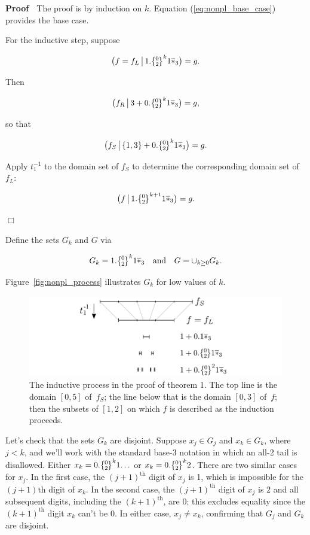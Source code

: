 \documentclass[]{article}
\begin{document}
\textbf{Proof} \(\;\) The proof is by induction on \(k\). Equation
(\ref{eq:nonpl_base_case}) provides the base case.

For the inductive step, suppose

\[\big(f=f_L \restrict 1.\zerotwo^k1\lstar \big) = g.\]

Then

\[\big(f_R \restrict 3 + 0.\zerotwo^k1\lstar \big) = g,\]

so that

\[\big(f_S \restrict \{1,3\} + 0.\zerotwo^k1\lstar \big) = g.\]

Apply \(t_1^{-1}\) to the domain set of \(f_S\) to determine the
corresponding domain set of \(f_L\):

\[\big(f \restrict 1.\zerotwo^{k+1}1\lstar \big) = g.\]

\hfill\(\Box\)

Define the sets \(G_k\) and \(G\) via

\begin{equation}G_k = 1.\zerotwo^k1\lstar \quad\text{and}\quad
  G = \cup_{k \ge 0}G_k.\label{eq:Gk_G}\end{equation}

Figure~\ref{fig:nonpl_process} illustrates \(G_k\) for low values of
\(k\).

\begin{figure}[htbp]
\centering
\includegraphics{images/pdfs/nonpl_process.pdf}
\caption{\label{fig:nonpl_process}The inductive process in the proof of
theorem 1. The top line is the domain \([0,5]\) of \(\,f_S\); the line
below that is the domain \([0,3]\) of \(\,f;\) then the subsets of
\([1,2]\) on which \(f\) is described as the induction
proceeds.}\label{fig:nonplux5fprocess}
\end{figure}

Let's check that the sets \(G_k\) are disjoint. Suppose \(x_j\in G_j\)
and \(x_k\in G_k\), where \(j < k\), and we'll work with the standard
base-3 notation in which an all-2 tail is disallowed. Either
\(x_k=0.\zerotwo^k1\!\ldots\) or \(x_k=0.\zerotwo^k2\). There are two
similar cases for \(x_j\). In the first case, the \((j+1)^\text{th}\)
digit of \(x_j\) is 1, which is impossible for the \((j+1)\text{th}\)
digit of \(x_k\). In the second case, the \((j+1)^\text{th}\) digit of
\(x_j\) is 2 and all subsequent digits, including the
\((k+1)^\text{th}\), are 0; this excludes equality since the
\((k+1)^\text{th}\) digit \(x_k\) can't be 0. In either case,
\(x_j\ne x_k\), confirming that \(G_j\) and \(G_k\) are disjoint.
\end{document}
